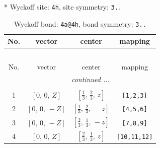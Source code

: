 \documentclass[fleqn,8pt]{jsarticle}
\begin{document}
* Wyckoff site: {\tt 4h}, site symmetry: {\tt 3..}
\renewcommand{\arraystretch}{1.2}
\begin{longtable}{cccc}
\caption{Wyckoff bond: {\tt 4a@4h}, bond symmetry: {\tt 3..}}
 \\
 \hline \hline
No. & vector & center & mapping \\ \hline \endfirsthead

\multicolumn{3}{l}{\tablename\ \thetable{}} \\
 \hline \hline
No. & vector & center & mapping \\ \hline \endhead

 \hline \hline
\multicolumn{3}{r}{\footnotesize\it continued ...} \\ \endfoot

 \hline \hline
\multicolumn{3}{r}{} \\ \endlastfoot

1 & $\left[ 0,\, 0,\, Z \right]$ & $\left[ \frac{1}{3},\, \frac{2}{3},\, z \right]$ & {\tt [1,2,3]} \\ \hline
2 & $\left[ 0,\, 0,\, - Z \right]$ & $\left[ \frac{1}{3},\, \frac{2}{3},\, - z \right]$ & {\tt [4,5,6]} \\ \hline
3 & $\left[ 0,\, 0,\, - Z \right]$ & $\left[ \frac{2}{3},\, \frac{1}{3},\, - z \right]$ & {\tt [7,8,9]} \\ \hline
4 & $\left[ 0,\, 0,\, Z \right]$ & $\left[ \frac{2}{3},\, \frac{1}{3},\, z \right]$ & {\tt [10,11,12]} \\
\end{longtable}
\renewcommand{\arraystretch}{1.2}
\end{document}
